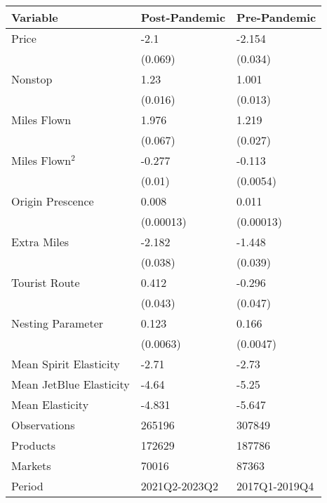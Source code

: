 
\begin{tabular}[t]{lll}
\toprule
Variable & Post-Pandemic & Pre-Pandemic\\
\midrule
Price & -2.1 & -2.154\\
 & (0.069) & (0.034)\\
Nonstop & 1.23 & 1.001\\
 & (0.016) & (0.013)\\
Miles Flown & 1.976 & 1.219\\
\addlinespace
 & (0.067) & (0.027)\\
Miles Flown$^2$ & -0.277 & -0.113\\
 & (0.01) & (0.0054)\\
Origin Prescence & 0.008 & 0.011\\
 & (0.00013) & (0.00013)\\
\addlinespace
Extra Miles & -2.182 & -1.448\\
 & (0.038) & (0.039)\\
Tourist Route & 0.412 & -0.296\\
 & (0.043) & (0.047)\\
Nesting Parameter & 0.123 & 0.166\\
\addlinespace
 & (0.0063) & (0.0047)\\
\midrule
Mean Spirit Elasticity & -2.71 & -2.73\\
Mean JetBlue Elasticity & -4.64 & -5.25\\
Mean Elasticity & -4.831 & -5.647\\
Observations & 265196 & 307849\\
\addlinespace
Products & 172629 & 187786\\
Markets & 70016 & 87363\\
Period & 2021Q2-2023Q2 & 2017Q1-2019Q4\\
\bottomrule
\end{tabular}
